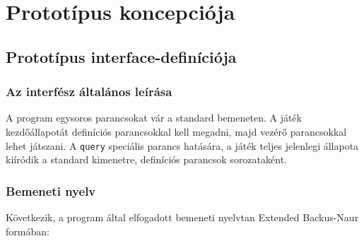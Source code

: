 %

\chapter{Prototípus koncepciója}

\thispagestyle{fancy}

\section{Prototípus interface-definíciója}

\subsection{Az interfész általános leírása}
A program egysoros parancsokat vár a standard bemeneten. A játék kezdőállapotát definíciós parancsokkal kell megadni, majd vezérő parancsokkal lehet játszani. A \texttt{query} speciális parancs hatására, a játék teljes jelenlegi állapota kiíródik a standard kimenetre, definíciós parancsok sorozataként.

\subsection{Bemeneti nyelv}
Következik, a program által elfogadott bemeneti nyelvtan Extended Backus-Naur formában:



